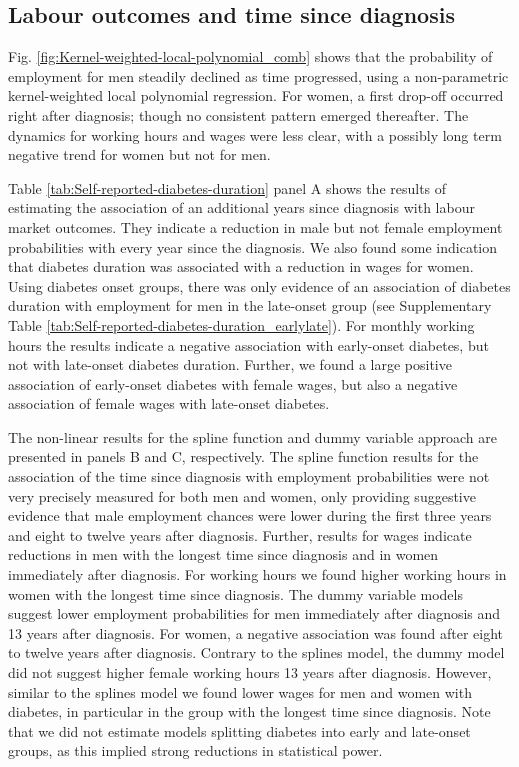 \documentclass[12pt,english]{article}
\begin{document}
\subsection{\label{sec:duration}Labour outcomes and time since diagnosis }

Fig. \ref{fig:Kernel-weighted-local-polynomial_comb} shows that the probability of employment for men steadily declined as time progressed, using a non-parametric kernel-weighted local polynomial regression. For women, a first drop-off occurred right after diagnosis; though no consistent pattern emerged thereafter. The dynamics for working hours and wages were less clear, with a possibly long term negative trend for women but not for men.


Table \ref{tab:Self-reported-diabetes-duration} panel A shows the results of estimating the association of an additional years since diagnosis with labour market outcomes. They indicate a reduction in male but not female employment probabilities with every year since the diagnosis. We also found some indication that diabetes duration was associated with a reduction in wages for women. Using diabetes onset groups, there was only evidence of an association of diabetes duration with employment for men in the late-onset group (see Supplementary Table \ref{tab:Self-reported-diabetes-duration_earlylate}). For monthly working hours the results indicate a negative association with early-onset diabetes, but not with late-onset diabetes duration. Further, we found a large positive association of early-onset diabetes with female wages, but also a negative association of female wages with late-onset diabetes.

The non-linear results for the spline function and dummy variable approach are  presented in panels B and C, respectively. The spline function results for the association of the time since diagnosis with employment probabilities were not very precisely measured for both men and women, only providing suggestive evidence that male employment chances were lower during the first three years and eight to twelve years after diagnosis. Further, results for wages indicate reductions in men with the longest time since diagnosis and in women immediately after diagnosis. For working hours we found  higher working hours in women with the longest time since diagnosis. The dummy variable models suggest lower employment probabilities for men  immediately after diagnosis and 13 years after diagnosis. For women, a negative association was found after eight to twelve years after diagnosis.  Contrary to the splines model, the dummy model did not suggest higher female working hours 13 years after diagnosis. However, similar to the splines model we found lower wages for men and women with diabetes, in particular in the group with the longest time since diagnosis.  Note that we did not estimate models splitting diabetes into early and late-onset groups, as this implied strong reductions in statistical power.
\end{document}
